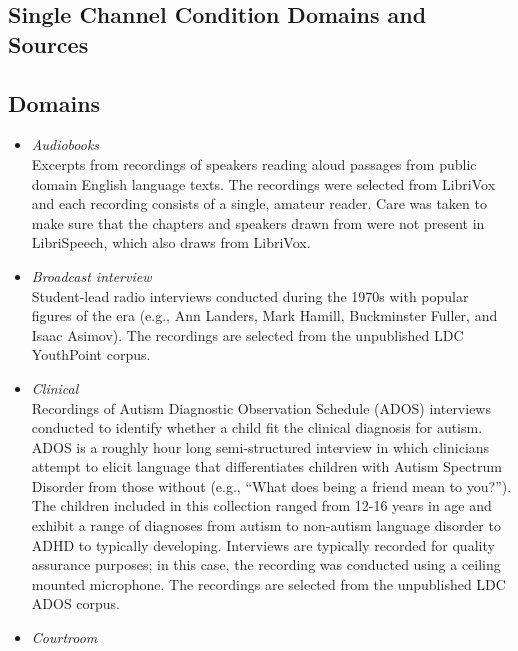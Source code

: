 \documentclass{article}
\begin{document}
\newpage
\begin{appendices}
\section{Single Channel Condition Domains and Sources}
\label{app:sources}

\subsection*{Domains}
    \begin{itemize}
        \item {\it Audiobooks} \\
            Excerpts from recordings of speakers reading aloud passages from public domain English language texts. The recordings were selected from LibriVox and each recording consists of a single, amateur reader. Care was taken to make sure that the chapters and speakers drawn from were not present in LibriSpeech, which also draws from LibriVox. 
        \item {\it Broadcast interview} \\
            Student-lead radio interviews conducted during the 1970s with popular figures of the era (e.g., Ann Landers, Mark Hamill, Buckminster Fuller, and Isaac Asimov). The recordings are selected from the unpublished LDC YouthPoint corpus.
        \item {\it Clinical} \\
            Recordings of Autism Diagnostic Observation Schedule (ADOS) interviews conducted to identify whether a child fit the clinical diagnosis for autism. ADOS is a roughly hour long semi-structured interview in which clinicians attempt to elicit language that differentiates children with Autism Spectrum Disorder from those without (e.g., ``What does being a friend mean to you?''). The children included in this collection ranged from 12-16 years in age and exhibit a range of diagnoses from autism to non-autism language disorder to ADHD to typically developing. Interviews are typically recorded for quality assurance purposes; in this case, the recording was conducted using a ceiling mounted microphone. The recordings are selected from the unpublished LDC ADOS corpus.
        \item {\it Courtroom} \\

\end{itemize}
\end{appendices}
\end{document}
